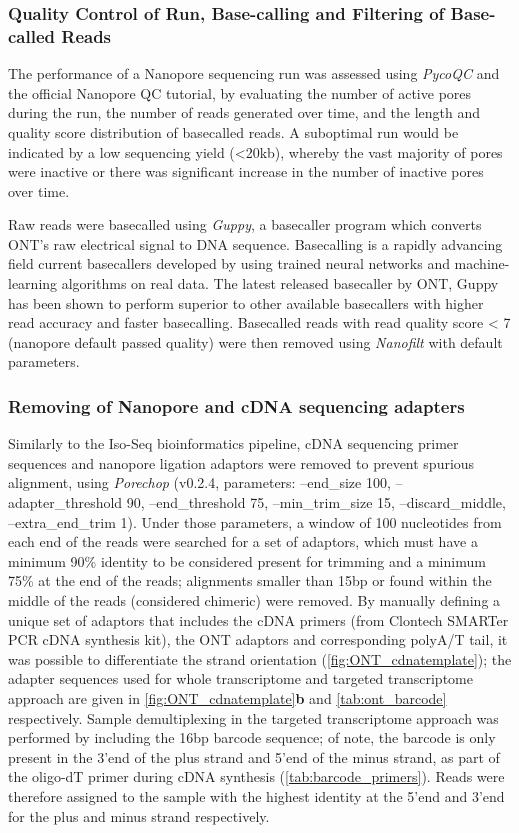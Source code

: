 \subsubsection{Quality Control of Run, Base-calling and Filtering of Base-called Reads}
The performance of a Nanopore sequencing run was assessed using \textit{PycoQC}\cite{Leger2019} and the official Nanopore QC tutorial\cite{ONT2019NanoporeQC}, by evaluating the number of active pores during the run, the number of reads generated over time, and the length and quality score distribution of basecalled reads. A suboptimal run would be indicated by a low sequencing yield (<20kb), whereby the vast majority of pores were inactive or there was significant increase in the number of inactive pores over time. 

Raw reads were basecalled using \textit{Guppy}, a basecaller program which converts ONT's raw electrical signal to DNA sequence. Basecalling is a rapidly advancing field current basecallers developed by using trained neural networks and machine-learning algorithms on real data\cite{Wick2019}. The latest released basecaller by ONT, Guppy has been shown to perform superior to other available basecallers with higher read accuracy and faster basecalling\cite{Wick2019}. Basecalled reads with read quality score < 7 (nanopore default passed quality) were then removed using \textit{Nanofilt}\cite{DeCoster2018} with default parameters. 

\subsubsection{Removing of Nanopore and cDNA sequencing adapters}
Similarly to the Iso-Seq bioinformatics pipeline, cDNA sequencing primer sequences and nanopore ligation adaptors were removed to prevent spurious alignment, using \textit{Porechop}\cite{Wick2017} (v0.2.4, parameters: --end\_size 100, --adapter\_threshold 90, --end\_threshold 75, --min\_trim\_size 15, --discard\_middle, --extra\_end\_trim 1). Under those parameters, a window of 100 nucleotides from each end of the reads were searched for a set of adaptors, which must have a minimum 90\% identity to be considered present for trimming and a minimum 75\% at the end of the reads; alignments smaller than 15bp or found within the middle of the reads (considered chimeric) were removed. By manually defining a unique set of adaptors that includes the cDNA primers (from Clontech SMARTer PCR cDNA synthesis kit), the ONT adaptors and corresponding polyA/T tail, it was possible to differentiate the strand orientation (\cref{fig:ONT_cdnatemplate}); the adapter sequences used for whole transcriptome and targeted transcriptome approach are given in \cref{fig:ONT_cdnatemplate}\textbf{b} and \cref{tab:ont_barcode} respectively. Sample demultiplexing in the targeted transcriptome approach was performed by including the 16bp barcode sequence; of note, the barcode is only present in the 3'end of the plus strand and 5'end of the minus strand, as part of the oligo-dT primer during cDNA synthesis (\cref{tab:barcode_primers}). Reads were therefore assigned to the sample with the highest identity at the 5'end and 3'end for the plus and minus strand respectively. 

